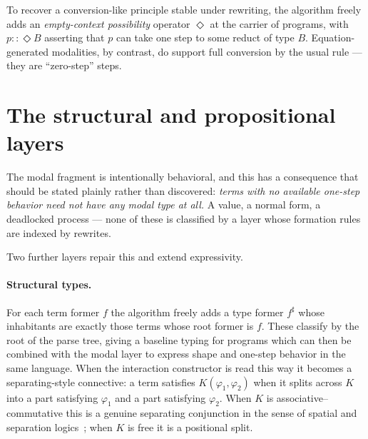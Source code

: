 
To recover a conversion-like principle stable under rewriting, the algorithm freely adds
an \emph{empty-context possibility} operator $\Diamond$ at the carrier of programs, with
$p :: \Diamond B$ asserting that $p$ can take one step to some reduct of type $B$.
Equation-generated modalities, by contrast, do support full conversion by the usual rule ---
they are ``zero-step'' steps.

\section{The structural and propositional layers}

The modal fragment is intentionally behavioral, and this has a consequence that should
be stated plainly rather than discovered: \emph{terms with no available one-step behavior
need not have any modal type at all.} A value, a normal form, a deadlocked process ---
none of these is classified by a layer whose formation rules are indexed by rewrites.

Two further layers repair this and extend expressivity.

\paragraph{Structural types.} For each term former $f$ the algorithm freely adds a type
former $f^\sharp$ whose inhabitants are exactly those terms whose root former is $f$.
These classify by the root of the parse tree, giving a baseline typing for programs which
can then be combined with the modal layer to express shape and one-step behavior in the
same language. When the interaction constructor is read this way it becomes a
separating-style connective: a term satisfies $K(\varphi_1,\varphi_2)$ when it splits
across $K$ into a part satisfying $\varphi_1$ and a part satisfying $\varphi_2$. When $K$
is associative--commutative this is a genuine separating conjunction in the sense of
spatial and separation logics~\cite{CairesCardelli,Reynolds2002}; when $K$ is free it
is a positional split.

